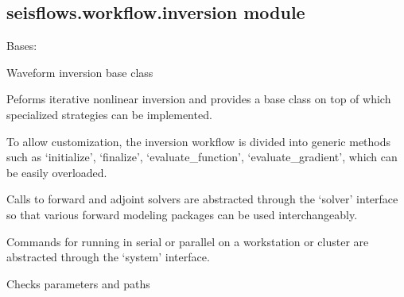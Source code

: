 \documentclass[letterpaper,10pt,english]{sphinxmanual}
\begin{document}
\subsection{seisflows.workflow.inversion module}
\label{\detokenize{ref/seisflows.workflow:module-seisflows.workflow.inversion}}\label{\detokenize{ref/seisflows.workflow:seisflows-workflow-inversion-module}}

\begin{fulllineitems}
\label{\detokenize{ref/seisflows.workflow:seisflows.workflow.inversion.inversion}}
Bases: {\hyperref[\detokenize{ref/seisflows.workflow:seisflows.workflow.base.base}]{}}

Waveform inversion base class

Peforms iterative nonlinear inversion and provides a base class on top
of which specialized strategies can be implemented.

To allow customization, the inversion workflow is divided into generic
methods such as ‘initialize’, ‘finalize’, ‘evaluate\_function’,
‘evaluate\_gradient’, which can be easily overloaded.

Calls to forward and adjoint solvers are abstracted through the ‘solver’
interface so that various forward modeling packages can be used
interchangeably.

Commands for running in serial or parallel on a workstation or cluster
are abstracted through the ‘system’ interface.

\begin{fulllineitems}
\label{\detokenize{ref/seisflows.workflow:seisflows.workflow.inversion.inversion.check}}
Checks parameters and paths

\end{fulllineitems}



\end{fulllineitems}
\end{document}
